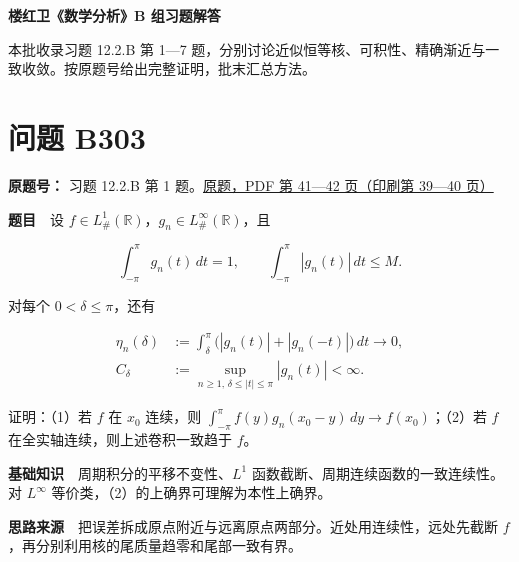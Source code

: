 \documentclass[11pt,a4paper]{article}
\begin{document}
\begin{center}
{\LARGE\bfseries 楼红卫《数学分析》B 组习题解答\par}
\vspace{7pt}{\large 第四十四批\quad B303—B309\par}
\vspace{5pt}{Fourier 收敛、可积性与共轭级数\par}
\end{center}
本批收录习题 12.2.B 第 1—7 题，分别讨论近似恒等核、可积性、精确渐近与一致收敛。按原题号给出完整证明，批末汇总方法。
\begingroup\setlength{\parskip}{0pt}\tableofcontents\endgroup

\section{问题 B303}\label{ux95eeux9898-b303}

\textbf{原题号：} 习题 12.2.B 第 1
题。\href{https://zj139.github.io/math-notes/files/problems/楼分析习题-v2.pdf\#page=41}{原题，PDF
第 41---42 页（印刷第 39---40 页）}

\textbf{题目}　设
\(f\in L^1_\#(\mathbb R)\)，\(g_n\in L^\infty_\#(\mathbb R)\)，且

\begin{equation}
\int_{-\pi}^{\pi}g_n(t)\,dt=1,\qquad
\int_{-\pi}^{\pi}|g_n(t)|\,dt\le M.\tag{1}
\end{equation}

对每个 \(0<\delta\le\pi\)，还有

\begin{equation}
\begin{aligned}
\eta_n(\delta)&:=\int_\delta^\pi\bigl(|g_n(t)|+|g_n(-t)|\bigr)\,dt\longrightarrow0,\\
C_\delta&:=\sup_{n\ge1,\,\delta\le|t|\le\pi}|g_n(t)|<\infty.
\end{aligned}\tag{2}
\end{equation}

证明：（1）若 \(f\) 在 \(x_0\) 连续，则
\(\int_{-\pi}^{\pi}f(y)g_n(x_0-y)\,dy\to f(x_0)\)；（2）若 \(f\)
在全实轴连续，则上述卷积一致趋于 \(f\)。

\textbf{基础知识}　周期积分的平移不变性、\(L^1\)
函数截断、周期连续函数的一致连续性。对 \(L^\infty\)
等价类，（2）的上确界可理解为本性上确界。

\textbf{思路来源}　把误差拆成原点附近与远离原点两部分。近处用连续性，远处先截断
\(f\)，再分别利用核的尾质量趋零和尾部一致有界。
\end{document}
